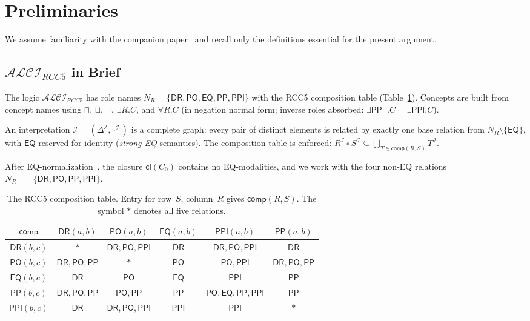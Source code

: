 \documentclass[a4paper,11pt]{article}
\theoremstyle{definition}
\newcommand{\ALCIRCC}[1]{\ensuremath{\mathcal{ALCI}_{\mathit{RCC#1}}}}
\newcommand{\NR}{\ensuremath{N_R}}
\newcommand{\DeltaI}{\ensuremath{\Delta^{\mathcal{I}}}}
\newcommand{\interp}{\ensuremath{\mathcal{I}}}
\newcommand{\DR}{\ensuremath{\mathsf{DR}}}
\newcommand{\PO}{\ensuremath{\mathsf{PO}}}
\newcommand{\EQ}{\ensuremath{\mathsf{EQ}}}
\newcommand{\PP}{\ensuremath{\mathsf{PP}}}
\newcommand{\PPI}{\ensuremath{\mathsf{PPI}}}
\newcommand{\comp}{\ensuremath{\mathsf{comp}}}
\newcommand{\cl}{\ensuremath{\mathsf{cl}}}
\begin{document}
\section{Preliminaries}
\label{sec:prelim}

We assume familiarity with the companion paper~\cite{CompanionPaper}
and recall only the definitions essential for the present argument.

\subsection{$\ALCIRCC{5}$ in Brief}

The logic $\ALCIRCC{5}$ has role names $\NR = \{\DR, \PO, \EQ, \PP,
\PPI\}$ with the RCC5 composition table (Table~\ref{tab:rcc5}).
Concepts are built from concept names using $\sqcap$, $\sqcup$,
$\neg$, $\exists R.C$, and $\forall R.C$ (in negation normal form;
inverse roles absorbed: $\exists \PP^{-}.C = \exists \PPI.C$).

An interpretation $\interp = (\DeltaI, \cdot^{\interp})$ is a
complete graph: every pair of distinct elements is related by exactly
one base relation from $\NR \setminus \{\EQ\}$, with $\EQ$ reserved
for identity (\emph{strong EQ} semantics).  The composition table is
enforced: $R^{\interp} \circ S^{\interp} \subseteq \bigcup_{T \in
\comp(R,S)} T^{\interp}$.

After EQ-normalization~\cite[Lemma~2.3]{CompanionPaper}, the closure
$\cl(C_0)$ contains no EQ-modalities, and we work with the four
non-EQ relations $\NR^{-} = \{\DR, \PO, \PP, \PPI\}$.

\begin{table}[t]
\centering
\caption{The RCC5 composition table.  Entry for row~$S$, column~$R$
gives $\comp(R, S)$.  The symbol $*$ denotes all five relations.}
\label{tab:rcc5}
\smallskip
\renewcommand{\arraystretch}{1.15}
\begin{tabular}{c|ccccc}
\toprule
$\comp$ & $\DR(a,b)$ & $\PO(a,b)$ & $\EQ(a,b)$ & $\PPI(a,b)$ & $\PP(a,b)$ \\
\midrule
$\DR(b,c)$  & $*$              & $\DR,\PO,\PPI$   & $\DR$  & $\DR,\PO,\PPI$       & $\DR$ \\
$\PO(b,c)$  & $\DR,\PO,\PP$    & $*$               & $\PO$  & $\PO,\PPI$           & $\DR,\PO,\PP$ \\
$\EQ(b,c)$  & $\DR$            & $\PO$             & $\EQ$  & $\PPI$               & $\PP$ \\
$\PP(b,c)$  & $\DR,\PO,\PP$    & $\PO,\PP$         & $\PP$  & $\PO,\EQ,\PP,\PPI$   & $\PP$ \\
$\PPI(b,c)$ & $\DR$            & $\DR,\PO,\PPI$    & $\PPI$ & $\PPI$               & $*$ \\
\bottomrule
\end{tabular}
\end{table}
\end{document}
